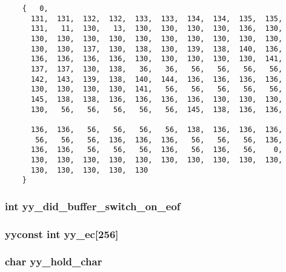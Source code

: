 \footnotesize\begin{verbatim}
    {   0,
      131,  131,  132,  132,  133,  133,  134,  134,  135,  135,
      131,   11,  130,   13,  130,  130,  130,  130,  136,  130,
      130,  130,  130,  130,  130,  130,  130,  130,  130,  130,
      130,  130,  137,  130,  138,  130,  139,  138,  140,  136,
      136,  136,  136,  136,  130,  130,  130,  130,  130,  141,
      137,  137,  130,  138,   36,   36,   56,   56,   56,   56,
      142,  143,  139,  138,  140,  144,  136,  136,  136,  136,
      130,  130,  130,  130,  141,   56,   56,   56,   56,   56,
      145,  138,  138,  136,  136,  136,  136,  130,  130,  130,
      130,   56,   56,   56,   56,   56,  145,  138,  136,  136,

      136,  136,   56,   56,   56,   56,  138,  136,  136,  136,
       56,   56,   56,  136,  136,  136,   56,   56,   56,  136,
      136,  136,   56,   56,   56,  136,   56,  136,   56,    0,
      130,  130,  130,  130,  130,  130,  130,  130,  130,  130,
      130,  130,  130,  130,  130
    }\end{verbatim}\normalsize 
{}
\subsubsection{\setlength{\rightskip}{0pt plus 5cm}int yy\_\-did\_\-buffer\_\-switch\_\-on\_\-eof\hspace{0.3cm}{\tt  [static]}}\label{vcd__lexer_8c_a84}


\subsubsection{\setlength{\rightskip}{0pt plus 5cm}yyconst int yy\_\-ec[256]\hspace{0.3cm}{\tt  [static]}}\label{vcd__lexer_8c_a89}


\subsubsection{\setlength{\rightskip}{0pt plus 5cm}char yy\_\-hold\_\-char\hspace{0.3cm}{\tt  [static]}}\label{vcd__lexer_8c_a79}


